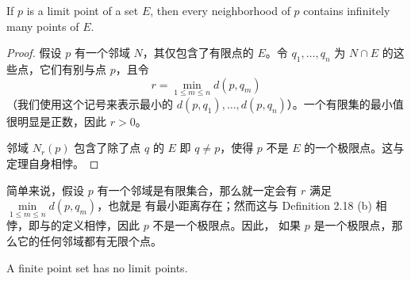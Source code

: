 \documentclass[../poma-notes.tex]{subfiles}
\begin{document}
\begin{theorem}
  If $p$ is a limit point of a set $E$, then every neighborhood of $p$ contains infinitely many points of $E$.
\end{theorem}

\begin{proof}
  假设 $p$ 有一个邻域 $N$，其仅包含了有限点的 $E$。令 $q_1,\dots,q_n$ 为 $N \cap E$ 的这些点，它们有别与点 $p$，且令
  \[r = \min\limits_{1 \le m \le n} d(p,q_m)\]
  （我们使用这个记号来表示最小的 $d(p,q_1),\dots,d(p,q_n)$）。一个有限集的最小值很明显是正数，因此 $r>0$。

  邻域 $N_r(p)$ 包含了除了点 $q$ 的 $E$ 即 $q \ne p$，使得 $p$ 不是 $E$ 的一个极限点。这与定理自身相悖。
\end{proof}

\begin{anote}
  简单来说，假设 $p$ 有一个邻域是有限集合，那么就一定会有 $r$ 满足 $\min\limits_{1 \le m \le n} d(p,q_m)$，也就是
  有最小距离存在；然而这与 Definition 2.18 (b) 相悖，即与的定义相悖，因此 $p$ 不是一个极限点。因此，
  如果 $p$ 是一个极限点，那么它的任何邻域都有无限个点。
\end{anote}

\begin{corollary}
  A finite point set has no limit points.
\end{corollary}
\end{document}
